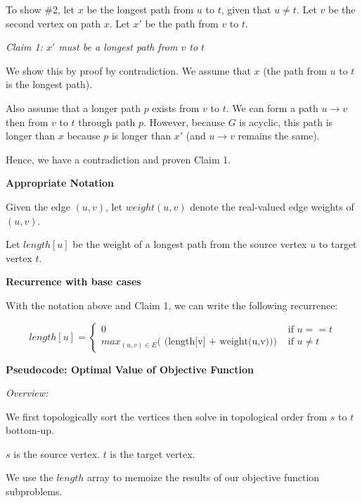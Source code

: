 \documentclass[a4paper]{report}
\begin{document}
\begin{enumerate}
      To show \#2, let $x$ be the longest path from $u$ to $t$, given that $u \neq t$. Let $v$ be the 
      second vertex on path $x$. Let $x'$ be the path from $v$ to $t$.

      {\it Claim 1: $x'$ must be a longest path from $v$ to $t$}

      We show this by proof by contradiction. We assume that $x$ (the path from $u$ to $t$ is the longest path). 

      Also assume that a longer path $p$ exists from $v$ to $t$. We can form a path $u \rightarrow v$ then from 
      $v$ to $t$ through path $p$. However, because $G$ is acyclic, this path is longer than 
      $x$ because $p$ is longer than $x'$ (and $u \rightarrow v$ remains the same).
      
      Hence, we have a contradiction and proven Claim 1. 



      {\bf Appropriate Notation}

      Given the edge $(u,v)$, let $weight(u,v)$ denote the real-valued edge weights of $(u,v)$.

      Let $length[u]$ be the weight of a longest path from the source vertex $u$ to target vertex $t$.


      {\bf Recurrence with base cases}

      With the notation above and Claim 1, we can write the following recurrence: 

      \begin{displaymath}
        length[u] = \left\{
          \begin{array}{lr}
            0  &   \text{ if $u == t$}\\
            \text{$max_{(u,v)\in E}$( (length[v] + weight(u,v)))}  &  \text{ if $u \neq t$ }
          \end{array}
          \right.
        \end{displaymath} 



      {\bf Pseudocode: Optimal Value of Objective Function}

      {\it Overview:}

      We first topologically sort the vertices then solve in topological order from $s$ to $t$ bottom-up.

      $s$ is the source vertex. $t$ is the target vertex. 

      We use the $length$ array to memoize the results of our objective function subproblems.


\end{enumerate}
\end{document}
